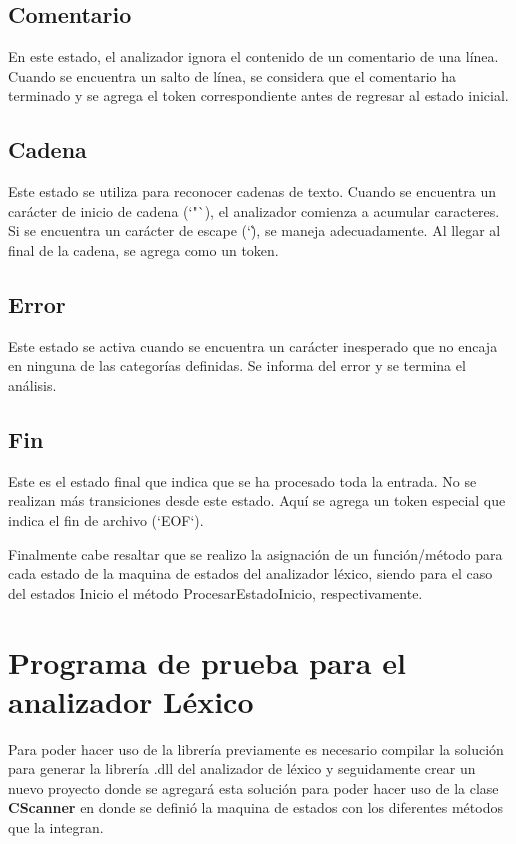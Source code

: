 \documentclass[conference]{IEEEtran}
\begin{document}
	\subsection{Comentario}
	En este estado, el analizador ignora el contenido de un comentario de una línea. Cuando se encuentra un salto de línea, se considera que el comentario ha terminado y se agrega el token correspondiente antes de regresar al estado inicial.
	
	\subsection{Cadena}
	Este estado se utiliza para reconocer cadenas de texto. Cuando se encuentra un carácter de inicio de cadena (`"`), el analizador comienza a acumular caracteres. Si se encuentra un carácter de escape (`\`), se maneja adecuadamente. Al llegar al final de la cadena, se agrega como un token.
	
	\subsection{Error}
	Este estado se activa cuando se encuentra un carácter inesperado que no encaja en ninguna de las categorías definidas. Se informa del error y se termina el análisis.
	
	\subsection{Fin}
	Este es el estado final que indica que se ha procesado toda la entrada. No se realizan más transiciones desde este estado. Aquí se agrega un token especial que indica el fin de archivo (`EOF`).
	
	Finalmente cabe resaltar que se realizo la asignación de un función/método para cada estado de la maquina de estados del analizador léxico, siendo para el caso del estados Inicio el método ProcesarEstadoInicio, respectivamente.
	
	\section{Programa de prueba para el analizador Léxico}
	
	Para poder hacer uso de la librería previamente es necesario compilar la solución para generar la librería .dll del analizador de léxico y seguidamente crear un nuevo proyecto donde se agregará esta solución para poder hacer uso de la clase \textbf{CScanner} en donde se definió la maquina de estados con los diferentes métodos que la integran.
	
\end{document}
